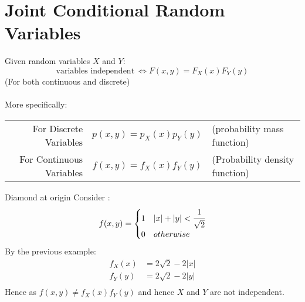 \section{Joint Conditional Random Variables}
Given random variables $X$ and $Y$:
\[\text{variables independent} \ \Leftrightarrow F(x,y) = F_X(x)F_Y(y)\]
(For both continuous and discrete)
\\
\\ More specifically:
\begin{center}
	\begin{tabular}{r c l}
		For Discrete Variables   & $p(x,y) = p_X(x)p_Y(y)$ & (probability mass function)    \\
		For Continuous Variables & $f(x,y) = f_X(x)f_Y(y)$ & (Probability density function) \\
	\end{tabular}
\end{center}
\begin{examplebox}{Diamond at origin}
	Consider :
	\[f(x,y) = \begin{cases}
			1 & |x| + |y| < \cfrac{1}{\sqrt{2}} \\
			0 & otherwise                       \\
		\end{cases}\]
	By the previous example:
	\[\begin{split}
			f_X(x) & = 2 \sqrt{2} - 2|x| \\
			f_Y(y) & = 2 \sqrt{2} - 2|y| \\
		\end{split}\]
	Hence as $f(x,y) \neq f_X(x)f_Y(y)$ and hence $X$ and $Y$ are not independent.
\end{examplebox}

